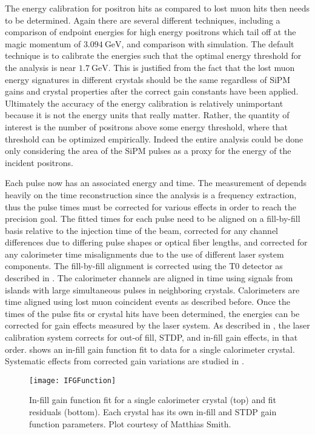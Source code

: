 The energy calibration for positron hits as compared to lost muon hits then needs to be determined. Again there are several different techniques, including a comparison of endpoint energies for high energy positrons which tail off at the magic momentum of $\SI{3.094}{\GeV}$, and comparison with simulation. The default technique is to calibrate the energies such that the optimal energy threshold for the \wa analysis is near $\SI{1.7}{\GeV}$. This is justified from the fact that the lost muon energy signatures in different crystals should be the same regardless of SiPM gains and crystal properties after the correct gain constants have been applied. Ultimately the accuracy of the energy calibration is relatively unimportant because it is not the energy units that really matter. Rather, the quantity of interest is the number of positrons above some energy threshold, where that threshold can be optimized empirically. Indeed the entire \wa analysis could be done only considering the area of the SiPM pulses as a proxy for the energy of the incident positrons.


Each pulse now has an associated energy and time. The measurement of \wa depends heavily on the time reconstruction since the analysis is a frequency extraction, thus the pulse times must be corrected for various effects in order to reach the precision goal. The fitted times for each pulse need to be aligned on a fill-by-fill basis relative to the injection time of the beam, corrected for any channel differences due to differing pulse shapes or optical fiber lengths, and corrected for any calorimeter time misalignments due to the use of different laser system components. The fill-by-fill alignment is corrected using the T0 detector as described in . The calorimeter channels are aligned in time using signals from islands with large simultaneous pulses in neighboring crystals. Calorimeters are time aligned using lost muon coincident events as described before. Once the times of the pulse fits or crystal hits have been determined, the energies can be corrected for gain effects measured by the laser system. As described in , the laser calibration system corrects for out-of fill, STDP, and in-fill gain effects, in that order.  shows an in-fill gain function fit to data for a single calorimeter crystal. Systematic effects from corrected gain variations are studied in .

\begin{figure}
    \centering
    \texttt{[image: IFGFunction]}
    \caption[In-fill gain function fit for a single calorimeter crystal]{In-fill gain function fit for a single calorimeter crystal (top) and fit residuals (bottom). Each crystal has its own in-fill and STDP gain function parameters. Plot courtesy of Matthias Smith.}
    \label{fig:IFGFunction}
\end{figure}



